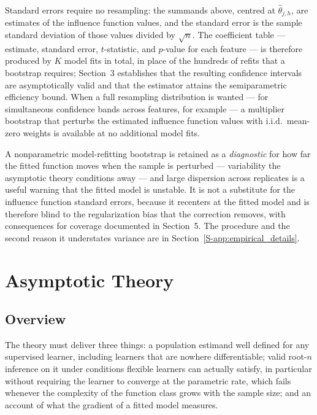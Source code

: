 \documentclass[12pt,a4paper]{article}
\numberwithin{equation}{section}
\theoremstyle{plain}
\theoremstyle{definition}
\begin{document}
	Standard errors require no resampling: the summands above, centred at
	$\hat{\theta}_{j,h}$, are estimates of the influence function values, and the
	standard error is the sample standard deviation of those values divided by
	$\sqrt{n}$. The coefficient table --- estimate, standard error, $t$-statistic,
	and $p$-value for each feature --- is therefore produced by $K$ model fits in
	total, in place of the hundreds of refits that a bootstrap requires; Section~3
	establishes that the resulting confidence intervals are asymptotically valid and
	that the estimator attains the semiparametric efficiency bound. When a full
	resampling distribution is wanted --- for simultaneous confidence bands across
	features, for example --- a multiplier bootstrap that perturbs the estimated
	influence function values with i.i.d.\ mean-zero weights is available at no
	additional model fits.
	
	A nonparametric model-refitting bootstrap \citep{efron1979,
	efrontibshirani1993} is retained as a \emph{diagnostic} for how far the
	fitted function moves when the sample is perturbed --- variability the
	asymptotic theory conditions away --- and large dispersion across replicates
	is a useful warning that the fitted model is unstable. It is not a substitute
	for the influence function standard errors, because it recenters at the
	fitted model and is therefore blind to the regularization bias that the
	correction removes, with consequences for coverage documented in Section~5.
	The procedure and the second reason it understates variance are in
	Section~\ref{S-app:empirical_details}.

	\section{Asymptotic Theory}
	\label{sec:theory}
	
	\subsection{Overview}

	The theory must deliver three things: a population estimand well defined for
	any supervised learner, including learners that are nowhere differentiable;
	valid root-$n$ inference on it under conditions flexible learners can
	actually satisfy, in particular without requiring the learner to converge at
	the parametric rate, which fails whenever the complexity of the function
	class grows with the sample size; and an account of what the gradient of a
	fitted model measures.
\end{document}

